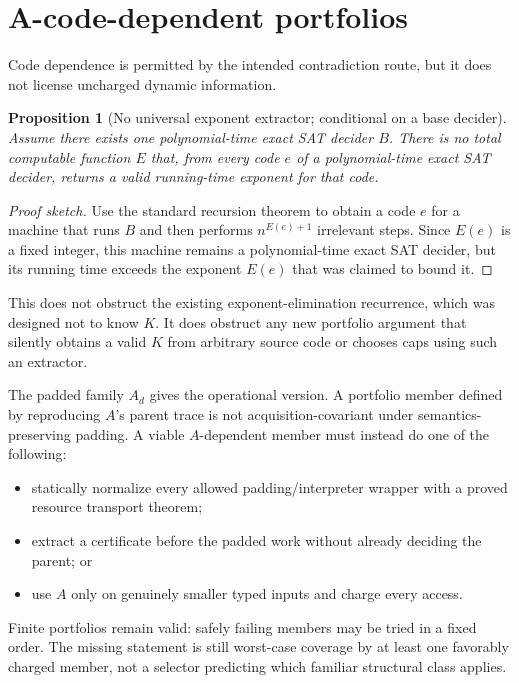 \documentclass[11pt]{article}
\newtheorem{proposition}[theorem]{Proposition}
\begin{document}
\section{A-code-dependent portfolios}

Code dependence is permitted by the intended contradiction route, but it
does not license uncharged dynamic information.

\begin{proposition}[No universal exponent extractor; conditional on a base
decider]
Assume there exists one polynomial-time exact SAT decider $B$.  There is no
total computable function $E$ that, from every code $e$ of a polynomial-time
exact SAT decider, returns a valid running-time exponent for that code.
\end{proposition}

\begin{proof}[Proof sketch]
Use the standard recursion theorem to obtain a code $e$ for a machine that
runs $B$ and then performs $n^{E(e)+1}$ irrelevant steps.  Since $E(e)$ is a
fixed integer, this machine remains a polynomial-time exact SAT decider, but
its running time exceeds the exponent $E(e)$ that was claimed to bound it.
\end{proof}

This does not obstruct the existing exponent-elimination recurrence, which
was designed not to know $K$.  It does obstruct any new portfolio argument
that silently obtains a valid $K$ from arbitrary source code or chooses caps
using such an extractor.

The padded family $A_d$ gives the operational version.  A portfolio member
defined by reproducing $A$'s parent trace is not acquisition-covariant under
semantics-preserving padding.  A viable $A$-dependent member must instead do
one of the following:
\begin{itemize}
\item statically normalize every allowed padding/interpreter wrapper with a
proved resource transport theorem;
\item extract a certificate before the padded work without already deciding
the parent; or
\item use $A$ only on genuinely smaller typed inputs and charge every access.
\end{itemize}

Finite portfolios remain valid: safely failing members may be tried in a
fixed order.  The missing statement is still worst-case coverage by at least
one favorably charged member, not a selector predicting which familiar
structural class applies.
\end{document}
